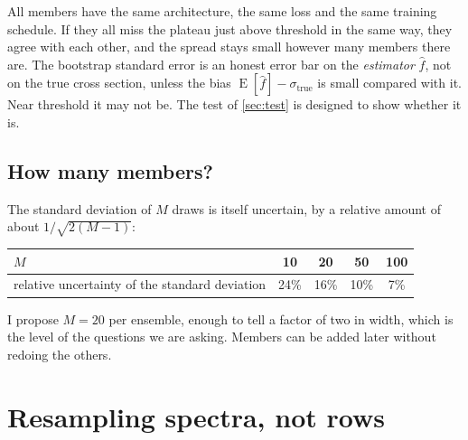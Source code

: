 \documentclass[11pt]{article}
\begin{document}
\begin{watch}
All members have the same architecture, the same loss and the same training schedule. If
they all miss the plateau just above threshold in the same way, they agree with each
other, and the spread stays small however many members there are. The bootstrap standard
error is an honest error bar on the \emph{estimator} $\hat f$, not on the true cross
section, unless the bias $\operatorname{E}[\hat f] - \sigma_\text{true}$ is small compared
with it. Near threshold it may not be. The test of \cref{sec:test} is designed to show
whether it is.
\end{watch}

\subsection{How many members?}

The standard deviation of $M$ draws is itself uncertain, by a relative amount of about
$1/\sqrt{2(M - 1)}$:

\begin{center}
\small
\begin{tabular}{lcccc}
\toprule
$M$ & 10 & 20 & 50 & 100\\
\midrule
relative uncertainty of the standard deviation & 24\% & 16\% & 10\% & 7\%\\
\bottomrule
\end{tabular}
\end{center}

\noindent I propose $M = 20$ per ensemble, enough to tell a factor of two in width,
which is the level of the questions we are asking. Members can be added later without
redoing the others.

\section{Resampling spectra, not rows}
\label{sec:resample}
\end{document}
